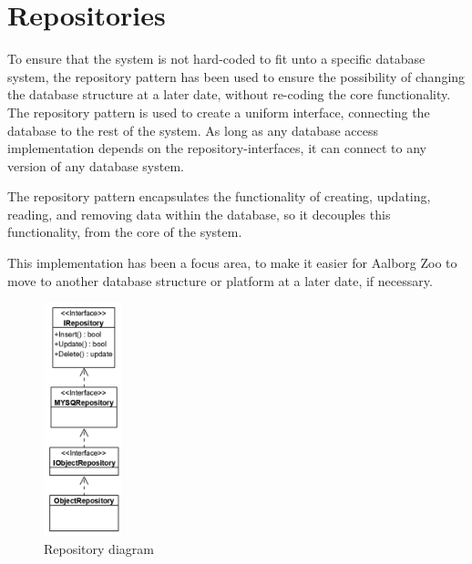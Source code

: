 \section{Repositories}
To ensure that the system is not hard-coded to fit unto a specific database system, the repository pattern \citep{RepositoryPattern} has been used to ensure the possibility of changing the database structure at a later date, without re-coding the core functionality. The repository pattern is used to create a uniform interface, connecting the database to the rest of the system. As long as any database access implementation depends on the repository-interfaces, it can connect to any version of any database system.
\par
The repository pattern encapsulates the functionality of creating, updating, reading, and removing data within the database, so it decouples this functionality, from the core of the system. 
\par
This implementation has been a focus area, to make it easier for Aalborg Zoo to move to another database structure or platform at a later date, if necessary. 

\begin{figure}[H]
    \centering
    \includegraphics[width=0.2\textwidth]{figures/Implementation/GenericRepositoryStructure.PNG}
    \caption{Repository diagram}
    \label{fig:RepositoryDiagram}
\end{figure}

